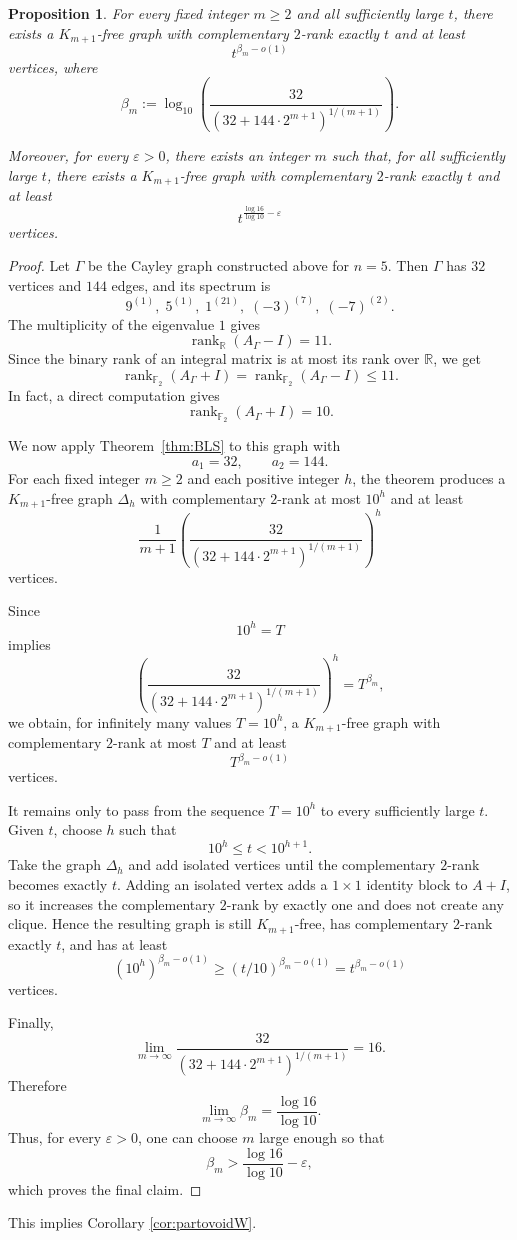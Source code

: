 \documentclass[a4paper,11pt]{amsproc}
\theoremstyle{plain}
\newtheorem{Proposition} [Theorem] {Proposition}
\theoremstyle{definition}
\newcommand{\<}{\langle}
\renewcommand{\>}{\rangle} %
\begin{document}
\begin{Proposition}\label{low2rank}
For every fixed integer $m\geq 2$ and all sufficiently large $t$, there exists a
$K_{m+1}$-free graph with complementary $2$-rank exactly $t$ and at least
\[
t^{\beta_m-o(1)}
\]
vertices, where
\[
\beta_m :=
\log_{10}\left(
\frac{32}{\left(32+144\cdot 2^{m+1}\right)^{1/(m+1)}}
\right).
\]


Moreover, for every $\varepsilon>0$, there exists an integer $m$ such that, for
all sufficiently large $t$, there exists a $K_{m+1}$-free graph with
complementary $2$-rank exactly $t$ and at least
\[
t^{\frac{\log 16}{\log 10}-\varepsilon}
\]
vertices.
\end{Proposition}

\begin{proof}
Let $\Gamma$ be the Cayley graph constructed above for $n=5$. Then $\Gamma$ has
$32$ vertices and $144$ edges, and its spectrum is
\[
9^{(1)},\; 5^{(1)},\; 1^{(21)},\; (-3)^{(7)},\; (-7)^{(2)}.
\]
The multiplicity of the eigenvalue $1$ gives
\[
\operatorname{rank}_{\mathbb R}(A_\Gamma-I)=11.
\]
Since the binary rank of an integral matrix is at most its rank over
$\mathbb R$, we get
\[
\operatorname{rank}_{\mathbb F_2}(A_\Gamma+I)
=
\operatorname{rank}_{\mathbb F_2}(A_\Gamma-I)
\leq 11.
\]
In fact, a direct computation gives
\[
\operatorname{rank}_{\mathbb F_2}(A_\Gamma+I)=10.
\]

We now apply Theorem~\ref{thm:BLS} to this graph with
\[
a_1=32,\qquad a_2=144.
\]
For each fixed integer $m\geq 2$ and each positive integer $h$, the theorem
produces a $K_{m+1}$-free graph $\Delta_h$ with complementary $2$-rank at most
$10^h$ and at least
\[
\frac{1}{m+1}
\left(
\frac{32}{\left(32+144\cdot 2^{m+1}\right)^{1/(m+1)}}
\right)^h
\]
vertices.

Since
\[
10^h = T
\]
implies
\[
\left(
\frac{32}{\left(32+144\cdot 2^{m+1}\right)^{1/(m+1)}}
\right)^h
=
T^{\beta_m},
\]
we obtain, for infinitely many values $T=10^h$, a $K_{m+1}$-free graph with
complementary $2$-rank at most $T$ and at least
\[
T^{\beta_m-o(1)}
\]
vertices.

It remains only to pass from the sequence $T=10^h$ to every sufficiently large
$t$. Given $t$, choose $h$ such that
\[
10^h\leq t<10^{h+1}.
\]
Take the graph $\Delta_h$ and add isolated vertices until the complementary
$2$-rank becomes exactly $t$. Adding an isolated vertex adds a $1\times 1$
identity block to $A+I$, so it increases the complementary $2$-rank by exactly
one and does not create any clique. Hence the resulting graph is still
$K_{m+1}$-free, has complementary $2$-rank exactly $t$, and has at least
\[
(10^h)^{\beta_m-o(1)}
\geq
(t/10)^{\beta_m-o(1)}
=
t^{\beta_m-o(1)}
\]
vertices.

Finally,
\[
\lim_{m\to\infty}
\frac{32}{\left(32+144\cdot 2^{m+1}\right)^{1/(m+1)}}
=
16.
\]
Therefore
\[
\lim_{m\to\infty}\beta_m
=
\frac{\log 16}{\log 10}.
\]
Thus, for every $\varepsilon>0$, one can choose $m$ large enough so that
\[
\beta_m>
\frac{\log 16}{\log 10}-\varepsilon,
\]
which proves the final claim.
\end{proof}
This implies Corollary \ref{cor:partovoidW}.
\end{document}
